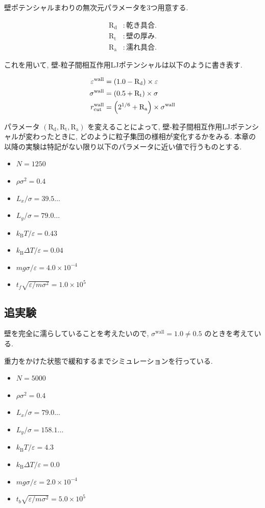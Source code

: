 \documentclass[dvipdfmx]{jsarticle}
\numberwithin{equation}{subsection}
\begin{document}
壁ポテンシャルまわりの無次元パラメータを3つ用意する.

\begin{align}
  \text{R}_\text{d} &: 乾き具合. \\
  \text{R}_\text{t} &: 壁の厚み. \\
  \text{R}_\text{a} &: 濡れ具合.
\end{align}

これを用いて, 壁-粒子間相互作用LJポテンシャルは以下のように書き表す.

\begin{align}
  \varepsilon^{\text{wall}} &= \qty(1.0 - \text{R}_\text{d}) \times \varepsilon \\
  \sigma^{\text{wall}} &= \qty(0.5 + \text{R}_\text{t}) \times \sigma \\
  r^{\text{wall}}_{\text{cut}} &= \qty(2^{1/6} + \text{R}_\text{a}) \times \sigma^{\text{wall}}
\end{align}

パラメータ $(\text{R}_\text{d}, \text{R}_\text{t}, \text{R}_\text{a})$ を変えることによって, 壁-粒子間相互作用LJポテンシャルが変わったときに, どのように粒子集団の様相が変化するかをみる. 本章の以降の実験は特記がない限り以下のパラメータに近い値で行うものとする. 

\begin{itemize}
  \item $N = 1250$
  \item $\rho {\sigma}^2 = 0.4$
  \item $L_x / \sigma = 39.5\dots$
  \item $L_y / \sigma = 79.0\dots$
  \item $k_{\text{B}} T / \varepsilon = 0.43$
  \item $k_{\text{B}} \Delta T / \varepsilon = 0.04$
  \item $mg\sigma/\varepsilon = 4.0 \times 10^{-4}$
  \item $t_f \sqrt{\varepsilon / m \sigma^2} = 1.0 \times 10^{5}$
\end{itemize}


\subsection{追実験}

壁を完全に濡らしていることを考えたいので, $\sigma^{\text{wall}}=1.0\neq 0.5$ のときを考えている.

重力をかけた状態で緩和するまでシミュレーションを行っている.

\begin{itemize}
  \item $N = 5000$
  \item $\rho \sigma^2 = 0.4$
  \item $L_x / \sigma = 79.0\dots$
  \item $L_y / \sigma = 158.1\dots$
  \item $k_{\text{B}} T/\varepsilon = 4.3$
  \item $k_{\text{B}} \Delta T/\varepsilon = 0.0$
  \item $mg\sigma/\varepsilon = 2.0 \times 10^{-4}$
  \item $t_b \sqrt{\varepsilon / m \sigma^2} = 5.0 \times 10^{5}$
\end{itemize}
\end{document}
